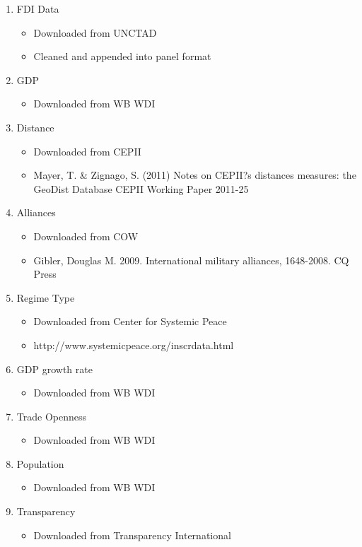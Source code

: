\documentclass{article}
\begin{document}
\begin{enumerate}
	\item {FDI Data}
		\begin{itemize}
			\item{Downloaded from UNCTAD}
			\item{Cleaned and appended into panel format}
		\end{itemize}
	\item {GDP}
		\begin{itemize}
			\item{Downloaded from WB WDI}
		\end{itemize}
	\item {Distance}
		\begin{itemize}
			\item{Downloaded from CEPII}
			\item{Mayer, T. \& Zignago, S. (2011) Notes on CEPII?s distances measures: the GeoDist Database
					CEPII Working Paper 2011-25}
		\end{itemize}
	\item {Alliances}
		\begin{itemize}
			\item{Downloaded from COW}
			\item{Gibler, Douglas M. 2009. International military alliances, 1648-2008. CQ Press}
		\end{itemize}
	\item {Regime Type}
		\begin{itemize}
			\item{Downloaded from Center for Systemic Peace}
			\item{http://www.systemicpeace.org/inscrdata.html}
		\end{itemize}
	\item {GDP growth rate}
		\begin{itemize}
			\item{Downloaded from WB WDI}
		\end{itemize}
	\item {Trade Openness}
		\begin{itemize}
			\item{Downloaded from WB WDI}
		\end{itemize}
	\item {Population}
		\begin{itemize}
			\item{Downloaded from WB WDI}
		\end{itemize}
	\item {Transparency}
		\begin{itemize}
			\item{Downloaded from Transparency International}
		\end{itemize}
		
\end{enumerate}
\end{document}
